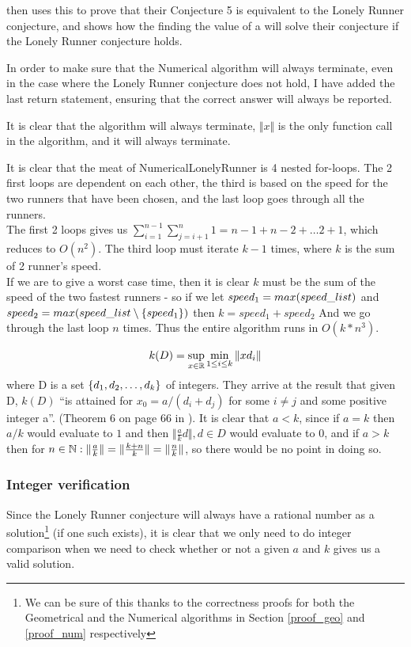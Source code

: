 \cite{invis} then uses this to prove that their Conjecture 5 is equivalent to the Lonely Runner conjecture, and shows how the finding the value of a will solve their conjecture if the Lonely Runner conjecture holds.

In order to make sure that the Numerical algorithm will always terminate, even in the case where the Lonely Runner conjecture does not hold, I have added the last return statement, ensuring that the correct answer will always be reported.

\begin{theo}[Termination:]
It is clear that the algorithm will always terminate, $\Vert x \Vert $ is the only function call in the algorithm, and it will always terminate.
\end{theo}

\begin{theo}
It is clear that the meat of NumericalLonelyRunner is 4 nested for-loops. The 2 first loops are dependent on each other, the third is based on the speed for the two runners that have been chosen, and the last loop goes through all the runners.\\

The first 2 loops gives us $\sum_{i=1}^{n-1}\sum_{j=i+1}^{n}1 = n-1 + n-2 + \ldots 2 + 1$, which reduces to $O(n^2)$. The third loop must iterate $k-1$ times, where $k$ is the sum of 2 runner's speed.\\

If we are to give a worst case time, then it is clear $k$ must be the sum of the speed of the two fastest runners - so if we let $speed_1 = max(speed\_list)$ and $speed_2 = max(speed\_list \setminus \{speed_1\})$ then $k = speed_1 + speed_2$
And we go through the last loop $n$ times. Thus the entire algorithm runs in $O(k * n^3)$.
\end{theo}

$$
k(D) = \sup_{x \in \mathbb{R}}\min_{1 \leq i \leq k}\Vert x d_i \Vert
$$
where D is a set $\{d_1, d_2, \ldots, d_k\}$ of integers. They arrive at the result that given D, $k(D)$ ``is attained for $x_0 = a /(d_i + d_j)$ for some $i \neq j$ and some positive integer a''. (Theorem 6 on page 66 in \cite{invis}). It is clear that $a < k$, since if $a = k$ then $a/k$ would evaluate to $1$ and then $\Vert \frac{a}{k} d\Vert, d \in D$ would evaluate to 0, and if $a > k$ then for $n \in \mathbb{N}: \Vert\frac{a}{k}\Vert = \Vert\frac{k+n}{k}\Vert = \Vert\frac{n}{k}\Vert$, so there would be no point in doing so.

\subsubsection{Integer verification}
Since the Lonely Runner conjecture will always have a rational number as a solution\footnote{We can be sure of this thanks to the correctness proofs for both the Geometrical and the Numerical algorithms in Section \ref{proof_geo} and \ref{proof_num} respectively} (if one such exists), it is clear that we only need to do integer comparison when we need to check whether or not a given $a$ and $k$ gives us a valid solution.

